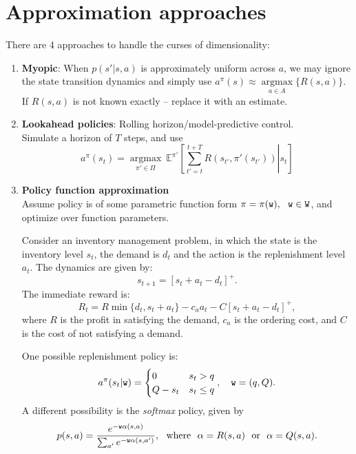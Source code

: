 \section{Approximation approaches}
There are 4 approaches to handle the curses of dimensionality:
\begin{enumerate}
\item \textbf{Myopic}: When $p(s'|s,a)$ is approximately uniform across $a$, we may ignore the state transition dynamics and simply use $a^\pi(s)\approx \underset{a \in A}{\operatorname{argmax}} \{R(s,a)\}$. If $R(s,a)$ is not known exactly -- replace it with an estimate.

\item \textbf{Lookahead policies}: Rolling horizon/model-predictive control.\\
Simulate a horizon of $T$ steps, and use
$$a^\pi(s_t) = \underset{\pi' \in \Pi}{\operatorname{argmax}}\  \mathbb{E}^{\pi'} \left[\left.\sum_{t'=t}^{t+T} R(s_{t'},\pi'(s_{t'}))\right|s_t\right]$$

\item \textbf{Policy function approximation}\\
Assume policy is of some parametric function form $\pi = \pi(\texttt{w}), \ \ \texttt{w} \in \mathtt{W}$, and optimize over function parameters.\\
\begin{example}
Consider an inventory management problem, in which the state is the inventory level $s_t$, the demand is $d_t$ and the action is the replenishment level $a_t$. The dynamics are given by:
$$s_{t+1} = [s_t + a_t-d_t]^+.$$
The immediate reward is:
$$R_t = R \min\{d_t,s_t+a_t\} - c_a a_t -C[s_t + a_t-d_t]^+,$$
where $R$ is the profit in satisfying the demand, $c_a$ is the ordering cost, and $C$ is the cost of not satisfying a demand.

One possible replenishment policy is:
$$a^\pi(s_t|\weights) = \begin{cases} 0 & s_t > q\\Q-s_t & s_t \le q \end{cases}, \ \ \ \weights=(q,Q).$$
A different possibility is the \emph{softmax} policy, given by
$$p(s,a) = \frac{e^{-\weights\alpha(s,a)}}{\sum_{a'} e^{-\weights\alpha(s,a')}}, \ \ \mathrm{where}\ \ \alpha=R(s,a)\ \ \mathrm{or} \ \ \alpha=Q(s,a).$$
\end{example}


\end{enumerate}
